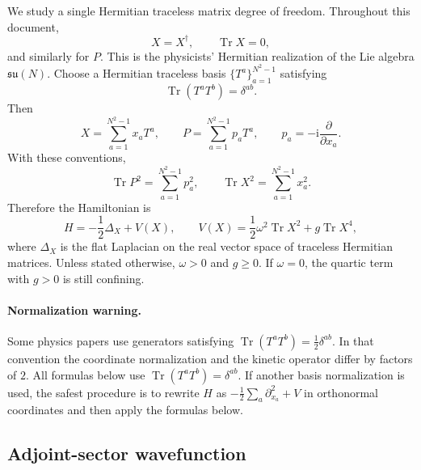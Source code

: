 \documentclass[11pt]{article}
\newcommand{\Tr}{\operatorname{Tr}}
\newcommand{\su}{\mathfrak{su}}
\newcommand{\ii}{\mathrm i}
\begin{document}
We study a single Hermitian traceless matrix degree of freedom.  Throughout this document,
\begin{equation}
X=X^\dagger,\qquad \Tr X=0,
\end{equation}
and similarly for $P$.  This is the physicists' Hermitian realization of the Lie algebra $\su(N)$.
Choose a Hermitian traceless basis $\{T^a\}_{a=1}^{N^2-1}$ satisfying
\begin{equation}
\Tr(T^aT^b)=\delta^{ab}.
\end{equation}
Then
\begin{equation}
X=\sum_{a=1}^{N^2-1}x_aT^a,
\qquad
P=\sum_{a=1}^{N^2-1}p_aT^a,
\qquad
p_a=-\ii\frac{\partial}{\partial x_a}.
\end{equation}
With these conventions,
\begin{equation}
\Tr P^2=\sum_{a=1}^{N^2-1}p_a^2,
\qquad
\Tr X^2=\sum_{a=1}^{N^2-1}x_a^2.
\end{equation}
Therefore the Hamiltonian is
\begin{equation}
\boxed{
H=-\frac12\Delta_X+V(X),
\qquad
V(X)=\frac12\omega^2\Tr X^2+g\Tr X^4,
}
\label{eq:cartesian_hamiltonian}
\end{equation}
where $\Delta_X$ is the flat Laplacian on the real vector space of traceless Hermitian matrices.
Unless stated otherwise, $\omega>0$ and $g\geq 0$.  If $\omega=0$, the quartic term with $g>0$ is still confining.

\paragraph{Normalization warning.}
Some physics papers use generators satisfying $\Tr(T^aT^b)=\frac12\delta^{ab}$.  In that convention the coordinate normalization and the kinetic operator differ by factors of $2$.  All formulas below use $\Tr(T^aT^b)=\delta^{ab}$.  If another basis normalization is used, the safest procedure is to rewrite $H$ as $-\frac12\sum_a\partial_{x_a}^2+V$ in orthonormal coordinates and then apply the formulas below.

\subsection{Adjoint-sector wavefunction}
\end{document}
